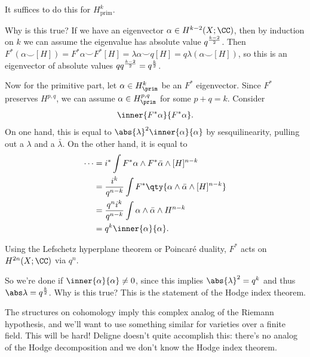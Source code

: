 \begin{claim}

It suffices to do this for \(H^k_{\text{prim}}\).

\end{claim}

Why is this true? If we have an eigenvector
\(\alpha\in H^{k-2}(X; \CC)\), then by induction on \(k\) we can assume
the eigenvalue has absolute value \(q^{k-2 \over 2}\). Then
\(F^*(\alpha \smile [H]) = F^* \alpha \smile F^*[H] = \lambda \alpha \smile q[H] = q\lambda (\alpha \smile [H])\),
so this is an eigenvector of absolute values
\(q q^{k-2\over 2} = q^{k\over 2}\).

Now for the primitive part, let \(\alpha\in H^k_{\prim}\) be an \(F^*\)
eigenvector. Since \(F^*\) preserves \(H^{p, q}\), we can assume
\(\alpha \in H^{p, q}_{\prim}\) for some \(p+q=k\). Consider
\begin{align*}  
\inner{F^* \alpha}{F^*\alpha}
.\end{align*} On one hand, this is equal to
\(\abs{\lambda}^2 \inner{\alpha}{\alpha}\) by sesquilinearity, pulling
out a \(\lambda\) and a \(\bar \lambda\). On the other hand, it is equal
to
\begin{align*}  
\cdots 
&= i^* \int F^* \alpha \wedge F^* \bar \alpha \wedge [H]^{n-k} \\
&= {i^k \over q^{n-k}} \int F^*\qty{\alpha \wedge \bar\alpha \wedge [H]^{n-k} } \\
&= {q^n i^k \over q^{n-k}} \int \alpha \wedge \bar \alpha \wedge H^{n-k} \\
&= q^k \inner{\alpha}{\alpha}
.\end{align*}

\begin{exercise}[?]

Using the Lefschetz hyperplane theorem or Poincaré duality, \(F^*\) acts
on \(H^{2n}(X; \CC)\) via \(q^n\).

\end{exercise}

So we're done if \(\inner{\alpha}{\alpha} \neq 0\), since this implies
\(\abs{\lambda}^2 = q^k\) and thus \(\abs \lambda = q^{k\over 2}\). Why
is this true? This is the statement of the Hodge index theorem.

\begin{remark}[Slogan]

The structures on cohomology imply this complex analog of the Riemann
hypothesis, and we'll want to use something similar for varieties over a
finite field. This will be hard! Deligne doesn't quite accomplish this:
there's no analog of the Hodge decomposition and we don't know the Hodge
index theorem.

\end{remark}

